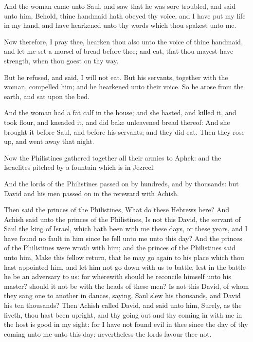 \Verse And the woman came unto Saul, and saw that he was sore troubled, and said unto him, Behold, thine handmaid hath obeyed thy voice, and I have put my life in my hand, and have hearkened unto thy words which thou spakest unto me.

\Verse Now therefore, I pray thee, hearken thou also unto the voice of thine handmaid, and let me set a morsel of bread before thee; and eat, that thou mayest have strength, when thou goest on thy way.

\Verse But he refused, and said, I will not eat. But his servants, together with the woman, compelled him; and he hearkened unto their voice. So he arose from the earth, and sat upon the bed.

\Verse And the woman had a fat calf in the house; and she hasted, and killed it, and took flour, and kneaded it, and did bake unleavened bread thereof: \Verse And she brought it before Saul, and before his servants; and they did eat. Then they rose up, and went away that night.


\Chapter
\Verse Now the Philistines gathered together all their armies to Aphek: and the Israelites pitched by a fountain which is in Jezreel.

\Verse And the lords of the Philistines passed on by hundreds, and by thousands: but David and his men passed on in the rereward with Achish.

\Verse Then said the princes of the Philistines, What do these Hebrews here?  And Achish said unto the princes of the Philistines, Is not this David, the servant of Saul the king of Israel, which hath been with me these days, or these years, and I have found no fault in him since he fell unto me unto this day?  \Verse And the princes of the Philistines were wroth with him; and the princes of the Philistines said unto him, Make this fellow return, that he may go again to his place which thou hast appointed him, and let him not go down with us to battle, lest in the battle he be an adversary to us: for wherewith should he reconcile himself unto his master? should it not be with the heads of these men?  \Verse Is not this David, of whom they sang one to another in dances, saying, Saul slew his thousands, and David his ten thousands?  \Verse Then Achish called David, and said unto him, Surely, as the \LORD liveth, thou hast been upright, and thy going out and thy coming in with me in the host is good in my sight: for I have not found evil in thee since the day of thy coming unto me unto this day: nevertheless the lords favour thee not.

